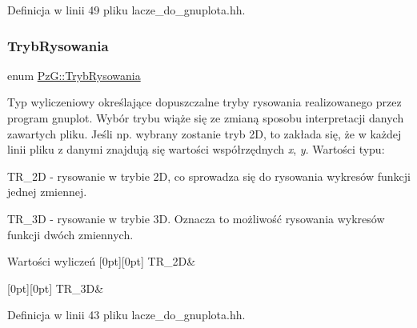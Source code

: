 Definicja w linii 49 pliku lacze\+\_\+do\+\_\+gnuplota.\+hh.

\mbox{\label{namespace_pz_g_aeedae1ef10c66d720f9e89de408ca4ca}} 
\subsubsection{\texorpdfstring{TrybRysowania}{TrybRysowania}}
{\footnotesize\ttfamily enum \mbox{\hyperlink{namespace_pz_g_aeedae1ef10c66d720f9e89de408ca4ca}{Pz\+G\+::\+Tryb\+Rysowania}}}

Typ wyliczeniowy określające dopuszczalne tryby rysowania realizowanego przez program {\ttfamily gnuplot}. Wybór trybu wiąże się ze zmianą sposobu interpretacji danych zawartych pliku. Jeśli np. wybrany zostanie tryb 2D, to zakłada się, że w każdej linii pliku z danymi znajdują się wartości współrzędnych {\itshape x}, {\itshape y}. Wartości typu\+: \begin{DoxyItemize}
\item {\ttfamily T\+R\+\_\+2D} -\/ rysowanie w trybie 2D, co sprowadza się do rysowania wykresów funkcji jednej zmiennej. \item {\ttfamily T\+R\+\_\+3D} -\/ rysowanie w trybie 3D. Oznacza to możliwość rysowania wykresów funkcji dwóch zmiennych. \end{DoxyItemize}
\begin{DoxyEnumFields}{Wartości wyliczeń}
[0pt][0pt]{}\mbox{\label{namespace_pz_g_aeedae1ef10c66d720f9e89de408ca4caa5eb0cf8b3405e136f092efdb489d60c4}} 
T\+R\+\_\+2D&\\
\hline

[0pt][0pt]{}\mbox{\label{namespace_pz_g_aeedae1ef10c66d720f9e89de408ca4caa856e6b0fa6b8a9dc184c60cf27dcc5d2}} 
T\+R\+\_\+3D&\\
\hline

\end{DoxyEnumFields}


Definicja w linii 43 pliku lacze\+\_\+do\+\_\+gnuplota.\+hh.



